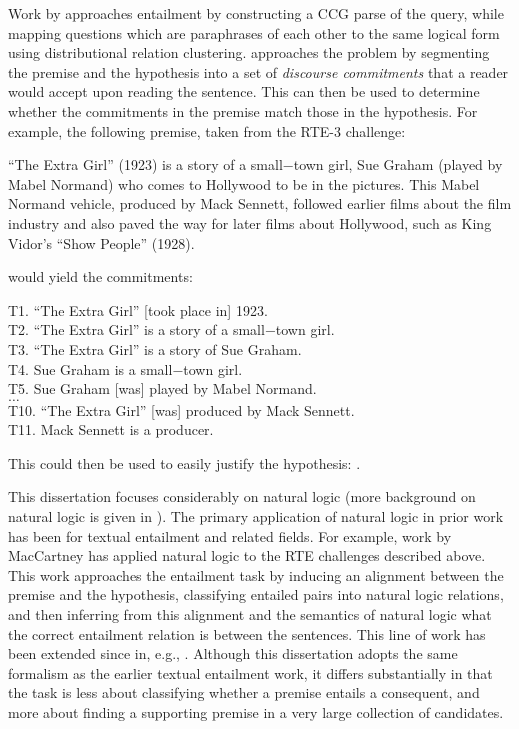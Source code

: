 Work by 
  approaches entailment by constructing a CCG parse of the query,
  while mapping questions which are paraphrases of each other to the
  same logical form using distributional relation clustering.
 approaches the problem by segmenting the premise and
  the hypothesis into a set of \textit{discourse commitments} that a reader would
  accept upon reading the sentence.
This can then be used to determine whether the commitments in the premise match those in
  the hypothesis.
For example, the following premise, taken from the RTE-3 challenge:

\begin{displayquote}
``The Extra Girl'' (1923) is a story of a small−town girl, Sue Graham (played by Mabel Normand) who comes to
  Hollywood to be in the pictures. 
This Mabel Normand vehicle, produced by Mack Sennett, followed earlier
  films about the film industry and also paved the way for later films about Hollywood, such as King Vidor’s
  ``Show People'' (1928).
\end{displayquote}

would yield the commitments:

\begin{displayquote}
T1. ``The Extra Girl'' [took place in] 1923. \\
T2. ``The Extra Girl'' is a story of a small−town girl. \\
T3. ``The Extra Girl'' is a story of Sue Graham. \\
T4. Sue Graham is a small−town girl. \\
T5. Sue Graham [was] played by Mabel Normand. \\
$\dots$ \\
T10. ``The Extra Girl'' [was] produced by Mack Sennett. \\
T11. Mack Sennett is a producer.
\end{displayquote}

\noindent This could then be used to easily justify the hypothesis:
  .


This dissertation focuses considerably on natural logic (more background on natural logic is given in ).
The primary application of natural logic in prior work has been
  for textual entailment and related fields.
For example, work by MacCartney 
  \cite{key:2007maccartney-natlog,key:2008maccartney-natlog,key:2009maccartney-natlog,key:2009maccartney-natlog}
  has applied natural logic to the RTE challenges described above.
This work approaches the entailment task by inducing an alignment between the premise and the
  hypothesis, classifying entailed pairs into natural logic relations, and then inferring
  from this alignment and the semantics of natural logic what the correct entailment
  relation is between the sentences.
This line of work has been extended since in, e.g., .
Although this dissertation adopts the same formalism as the earlier textual entailment work,
  it differs substantially in that the task is less about classifying whether a premise entails
  a consequent, and more about finding a supporting premise in a very large collection of
  candidates.


